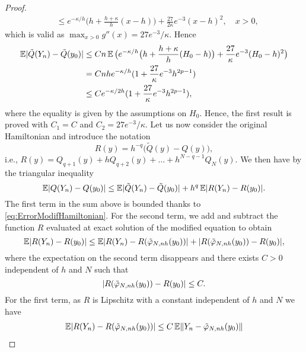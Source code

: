\documentclass{siamart1116}
\numberwithin{theorem}{section}
\DeclarePairedDelimiter{\abs}{\lvert}{\rvert}
\DeclarePairedDelimiter{\norm}{\|}{\|}
\renewcommand{\phi}{\varphi}
\newcommand{\E}{\operatorname{\mathbb{E}}}
\begin{document}
\begin{proof}
\begin{equation}
\begin{aligned}
	&\leq e^{-\kappa/h} \big(h + \frac{h + \kappa}{h}(x-h)\big) + \frac{27}{2\kappa}e^{-3} (x-h)^2, \quad x > 0,
\end{aligned}
\end{equation}
which is valid as $\max_{x>0} g''(x) = 27e^{-3}/\kappa$. Hence
\begin{equation}\label{eq:ErrorModifHamiltonian}
\begin{aligned}
\E \abs{\tilde Q(Y_n) - \tilde Q(y_0)} &\leq Cn \E\big( e^{-\kappa/h} \big(h + \frac{h + \kappa}{h}(H_0-h)\big) + \frac{27}{\kappa}e^{-3} (H_0-h)^2 \big) \\
&= Cnhe^{-\kappa/h}(1 + \frac{27}{\kappa}e^{-3} h^{2p-1}) \\
&\leq Ce^{-\kappa/2h}(1 + \frac{27}{\kappa}e^{-3} h^{2p-1}),
\end{aligned}
\end{equation}
where the equality is given by the assumptions on $H_0$. Hence, the first result is proved with $C_1 = C$ and $C_2 = 27e^{-3}/\kappa$. Let us now consider the original Hamiltonian and introduce the notation
\begin{equation}
	R(y) = h^{-q}\big(\tilde Q(y) - Q(y)\big), 
\end{equation}
i.e., $R(y) = Q_{q+1}(y) + h Q_{q+2}(y) + \ldots + h^{N-q-1} Q_N(y)$. We then have by the triangular inequality
\begin{equation}
	\E\abs{Q(Y_n) - Q(y_0)} \leq \E\abs{\tilde Q(Y_n) - \tilde Q (y_0)} + h^q \E\abs{R(Y_n) - R(y_0)}.
\end{equation}
The first term in the sum above is bounded thanks to \eqref{eq:ErrorModifHamiltonian}. For the second term, we add and subtract the function $R$ evaluated at exact solution of the modified equation to obtain
\begin{equation}
	\E\abs{R(Y_n) - R(y_0)} \leq \E\abs{R(Y_n) - R(\tilde \phi_{N,nh}(y_0))} + \abs{R(\tilde \phi_{N,nh}(y_0)) - R(y_0)},
\end{equation}
where the expectation on the second term disappears and there exists $C > 0$ independent of $h$ and $N$ such that
\begin{equation}
	\abs{R(\tilde \phi_{N,nh}(y_0)) - R(y_0)} \leq C.
\end{equation}
For the first term, as $R$ is Lipschitz with a constant independent of $h$ and $N$ we have
\begin{equation}
\begin{aligned}
	\E\abs{R(Y_n) - R(\tilde \phi_{N,nh}(y_0))}	&\leq C \E\norm{Y_n - \tilde \phi_{N,nh}(y_0)} \\

\end{aligned}
\end{equation}
\end{proof}
\end{document}

